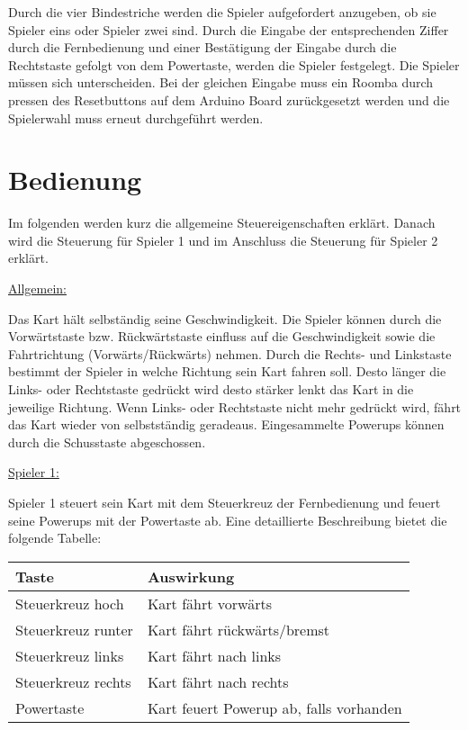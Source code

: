 Durch die vier Bindestriche werden die Spieler aufgefordert anzugeben, ob sie Spieler eins oder Spieler zwei sind. Durch die Eingabe der entsprechenden Ziffer durch die Fernbedienung und einer Bestätigung der Eingabe durch die Rechtstaste gefolgt von dem Powertaste, werden die Spieler festgelegt. Die Spieler müssen sich unterscheiden. Bei der gleichen Eingabe muss ein Roomba durch pressen des Resetbuttons auf dem Arduino Board zurückgesetzt werden und die Spielerwahl muss erneut durchgeführt werden. 
   
\section{Bedienung}
Im folgenden werden kurz die allgemeine Steuereigenschaften erklärt. Danach wird die Steuerung für Spieler 1 und im Anschluss die Steuerung für Spieler 2 erklärt. 

\underline{Allgemein:} 

Das Kart hält selbständig seine Geschwindigkeit. Die Spieler können durch die Vorwärtstaste bzw. Rückwärtstaste einfluss auf die Geschwindigkeit sowie die Fahrtrichtung (Vorwärts/Rückwärts) nehmen. Durch die Rechts- und Linkstaste bestimmt der Spieler in welche Richtung sein Kart fahren soll. Desto länger die Links- oder Rechtstaste gedrückt wird desto stärker lenkt das Kart in die jeweilige Richtung. Wenn Links- oder Rechtstaste nicht mehr gedrückt wird, fährt das Kart wieder von selbstständig geradeaus. Eingesammelte Powerups können durch die Schusstaste abgeschossen.

\underline{Spieler 1:}

Spieler 1 steuert sein Kart mit dem Steuerkreuz der Fernbedienung und feuert seine Powerups mit der Powertaste ab. Eine detaillierte Beschreibung bietet die folgende Tabelle:

\vspace{0.5cm}
\begin{tabular}{|l|l|}
\hline
Taste & Auswirkung \\ \hline
Steuerkreuz hoch & Kart fährt vorwärts \\ \hline
Steuerkreuz runter & Kart fährt rückwärts/bremst \\ \hline
Steuerkreuz links & Kart fährt nach links \\ \hline
Steuerkreuz rechts & Kart fährt nach rechts \\ \hline
Powertaste & Kart feuert Powerup ab, falls vorhanden \\ \hline  
\end{tabular} 
\vspace{0.5cm}

